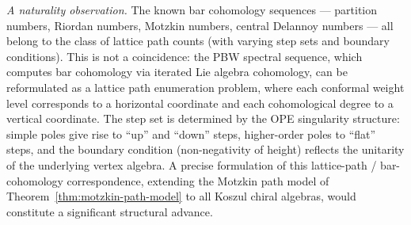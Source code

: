 \medskip

\emph{A naturality observation.}  The known bar cohomology sequences --- partition numbers, Riordan numbers, Motzkin numbers, central Delannoy numbers --- all belong to the class of lattice path counts (with varying step sets and boundary conditions).  This is not a coincidence: the PBW spectral sequence, which computes bar cohomology via iterated Lie algebra cohomology, can be reformulated as a lattice path enumeration problem, where each conformal weight level corresponds to a horizontal coordinate and each cohomological degree to a vertical coordinate.  The step set is determined by the OPE singularity structure: simple poles give rise to ``up'' and ``down'' steps, higher-order poles to ``flat'' steps, and the boundary condition (non-negativity of height) reflects the unitarity of the underlying vertex algebra.  A precise formulation of this lattice-path / bar-cohomology correspondence, extending the Motzkin path model of Theorem~\ref{thm:motzkin-path-model} to all Koszul chiral algebras, would constitute a significant structural advance.
